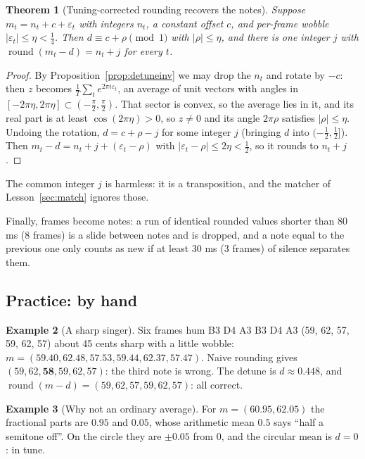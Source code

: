 \documentclass[11pt]{article}
\newtheorem{theorem}{Theorem}[section]
\theoremstyle{definition}
\newtheorem{example}[theorem]{Example}
\newcommand{\abs}[1]{\lvert #1\rvert}
\newcommand{\round}{\operatorname{round}}
\begin{document}
\begin{theorem}[Tuning-corrected rounding recovers the notes]\label{thm:detune}
Suppose $m_t=n_t+c+\varepsilon_t$ with integers $n_t$, a constant offset $c$, and
per-frame wobble $\abs{\varepsilon_t}\le\eta<\frac14$. Then $d\equiv c+\rho\pmod1$ with
$\abs\rho\le\eta$, and there is one integer $j$ with $\round(m_t-d)=n_t+j$ for every
$t$.
\end{theorem}
\begin{proof}
By Proposition~\ref{prop:detuneinv} we may drop the $n_t$ and rotate by $-c$: then $z$
becomes $\frac1T\sum_te^{2\pi i\varepsilon_t}$, an average of unit vectors with angles in
$[-2\pi\eta,2\pi\eta]\subset(-\frac\pi2,\frac\pi2)$. That sector is convex, so the average lies in it, and
its real part is at least $\cos(2\pi\eta)>0$, so $z\ne0$ and its angle $2\pi\rho$
satisfies $\abs\rho\le\eta$. Undoing the rotation, $d=c+\rho-j$ for some integer $j$
(bringing $d$ into $(-\frac12,\frac12]$). Then
$m_t-d=n_t+j+(\varepsilon_t-\rho)$ with $\abs{\varepsilon_t-\rho}\le2\eta<\frac12$, so it
rounds to $n_t+j$.
\end{proof}

The common integer $j$ is harmless: it is a transposition, and the matcher of
Lesson~\ref{sec:match} ignores those.

Finally, frames become notes: a run of identical rounded values shorter than 80 ms
(8 frames) is a slide between notes and is dropped, and a note equal to the previous
one only counts as new if at least 30 ms (3 frames) of silence separates them.

\subsection{Practice: by hand}

\begin{example}[A sharp singer]
Six frames hum B3 D4 A3 B3 D4 A3 (59, 62, 57, 59, 62, 57) about 45 cents sharp with a
little wobble: $m=(59.40,62.48,57.53,59.44,62.37,57.47)$. Naive rounding gives
$(59,62,\mathbf{58},59,62,57)$: the third note is wrong. The detune is
$d\approx0.448$, and $\round(m-d)=(59,62,57,59,62,57)$: all correct.
\end{example}

\begin{example}[Why not an ordinary average]
For $m=(60.95,62.05)$ the fractional parts are $0.95$ and $0.05$, whose arithmetic
mean $0.5$ says ``half a semitone off''. On the circle they are $\pm0.05$ from 0, and
the circular mean is $d=0$: in tune.
\end{example}
\end{document}
